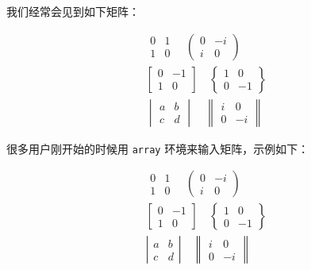 我们经常会见到如下矩阵：
\begin{example}
\begin{gather*}
 \begin{matrix}  0 &  1 \\ 1 &  0 \end{matrix}\quad
 \begin{pmatrix} 0 & -i \\ i &  0 \end{pmatrix}\\
 \begin{bmatrix} 0 & -1 \\ 1 &  0 \end{bmatrix}\quad
 \begin{Bmatrix} 1 &  0 \\ 0 & -1 \end{Bmatrix}\\
 \begin{vmatrix} a &  b \\ c &  d \end{vmatrix}\quad
 \begin{Vmatrix} i &  0 \\ 0 & -i \end{Vmatrix}
\end{gather*}
\end{example}

很多用户刚开始的时候用 \verb|array| 环境来输入矩阵，示例如下：
\begin{example}
\begin{gather*}
 \begin{array}{cc}  0 &  1 \\ 1 &  0 \end{array}  \quad
 \left(\begin{array}{cc}  0 & -i \\ i &  0 \end{array}\right) \\
 \left[\begin{array}{cc} 0 & -1 \\ 1 &  0 \end{array}\right] \quad
 \left\{\begin{array}{cc} 1 &  0 \\ 0 & -1 \end{array}\right\} \\
 \left|\begin{array}{cc} a &  b \\ c &  d \end{array}\right| \quad
 \left\|\begin{array}{cc} i &  0 \\ 0 & -i \end{array}\right\|
\end{gather*}
\end{example}

